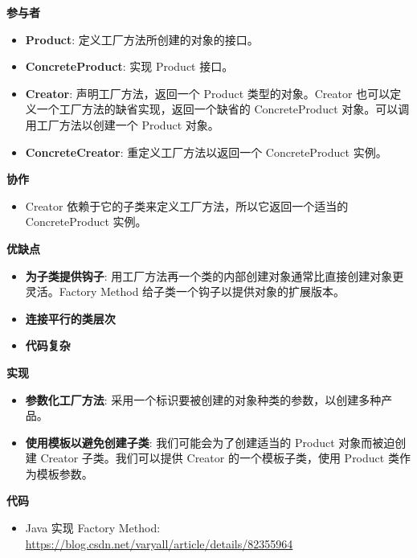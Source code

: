 \noindent\textbf{参与者}

\begin{itemize}
    \item \textbf{Product}: 定义工厂方法所创建的对象的接口。
    \item \textbf{ConcreteProduct}: 实现 Product 接口。
    \item \textbf{Creator}: 声明工厂方法，返回一个 Product 类型的对象。Creator 也可以定义一个工厂方法的缺省实现，返回一个缺省的 ConcreteProduct 对象。可以调用工厂方法以创建一个 Product 对象。
    \item \textbf{ConcreteCreator}: 重定义工厂方法以返回一个 ConcreteProduct 实例。
\end{itemize}

\noindent\textbf{协作}

\begin{itemize}
    \item Creator 依赖于它的子类来定义工厂方法，所以它返回一个适当的 ConcreteProduct 实例。
\end{itemize}

\noindent\textbf{优缺点}

\begin{itemize}
    \item \textbf{为子类提供钩子}: 用工厂方法再一个类的内部创建对象通常比直接创建对象更灵活。Factory Method 给子类一个钩子以提供对象的扩展版本。
    \item \textbf{连接平行的类层次}
    \item \textbf{代码复杂}
\end{itemize}

\noindent\textbf{实现}

\begin{itemize}
    \item \textbf{参数化工厂方法}: 采用一个标识要被创建的对象种类的参数，以创建多种产品。
    \item \textbf{使用模板以避免创建子类}: 我们可能会为了创建适当的 Product 对象而被迫创建 Creator 子类。我们可以提供 Creator 的一个模板子类，使用 Product 类作为模板参数。
\end{itemize}

\noindent\textbf{代码}

\begin{itemize}
    \item Java 实现 Factory Method: \url{https://blog.csdn.net/varyall/article/details/82355964}
\end{itemize}



\newpage